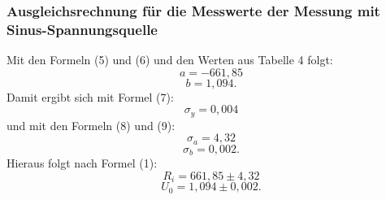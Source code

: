\subsubsection{Ausgleichsrechnung für die Messwerte der Messung mit Sinus-Spannungsquelle}
Mit den Formeln (5) und (6) und den Werten aus Tabelle 4 folgt:
\begin{displaymath}
a=-661,85
\end{displaymath}
\begin{displaymath}
b=1,094\text{.}
\end{displaymath}
Damit ergibt sich mit Formel (7):
\begin{displaymath}
\sigma_y=0,004
\end{displaymath}
und mit den Formeln (8) und (9):
\begin{displaymath}
\sigma_a=4,32
\end{displaymath}
\begin{displaymath}
\sigma_b=0,002\text{.}
\end{displaymath}
Hieraus folgt nach Formel (1):
\begin{displaymath}
R_i=661,85\pm 4,32
\end{displaymath}
\begin{displaymath}
U_0=1,094\pm 0,002\text{.}
\end{displaymath}
























































